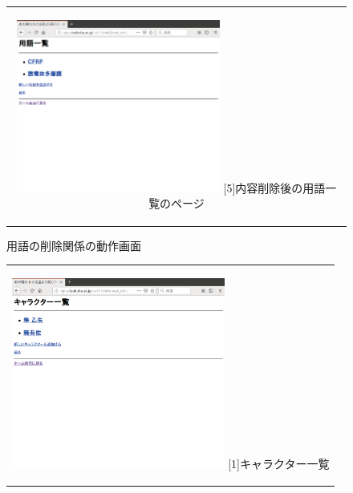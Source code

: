 \documentclass[12pt,a4paper]{jarticle}
\begin{document}
\begin{ttfamily}
\begin{figure}[htbp]
\begin{center}
\begin{tabular}{c}
      \begin{minipage}{0.55\hsize}
        \begin{center}
          \includegraphics[width=6.7cm]{10-3-20.eps}
          \hspace{1.6cm} [5]内容削除後の用語一覧のページ
        \end{center}
      \end{minipage}

    \end{tabular}
    \caption{用語の削除関係の動作画面}
    \label{fig:b}
  \end{center}
\end{figure}

\begin{figure}[htbp]
  \begin{center}
    \begin{tabular}{c}

      \begin{minipage}{0.55\hsize}
        \begin{center}
          \includegraphics[width=7.0cm]{10-3-21.eps}
          \hspace{1.6cm} [1]キャラクター一覧
        \end{center}
      \end{minipage}


\end{tabular}
\end{center}
\end{figure}
\end{ttfamily}
\end{document}
